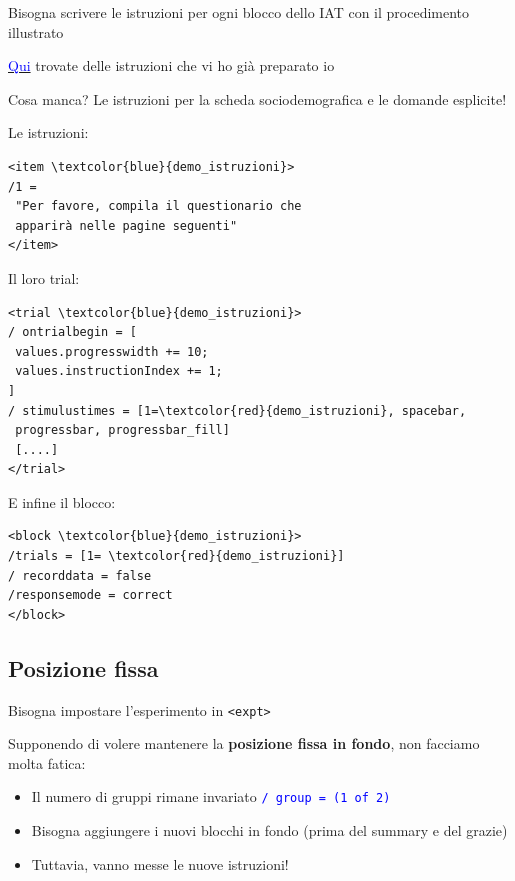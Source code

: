 \documentclass{beamer}
\begin{document}
\begin{frame}
	Bisogna scrivere le istruzioni per ogni blocco dello IAT con il procedimento illustrato
	
	
	\vspace{3mm}
	\href{https://drive.google.com/file/d/11qOVR5-yGDc1lRPUpTt7327o9Z2Tt4_A/view?usp=sharing}{\textcolor{blue}{Qui}} trovate delle istruzioni che vi ho già preparato io 
	
	\vspace{3mm}
	Cosa manca? Le istruzioni per la scheda sociodemografica e le domande esplicite! 
\end{frame}

\begin{frame}[fragile]
	\begin{small}
			Le istruzioni:

\begin{Verbatim}[commandchars=\\\{\}]
<item \textcolor{blue}{demo_istruzioni}>
/1 = 
 "Per favore, compila il questionario che 
 apparirà nelle pagine seguenti"
</item>
\end{Verbatim}
		
		Il loro trial: 
		
		
		\begin{Verbatim}[commandchars=\\\{\}]
<trial \textcolor{blue}{demo_istruzioni}>
/ ontrialbegin = [
 values.progresswidth += 10;
 values.instructionIndex += 1;
]
/ stimulustimes = [1=\textcolor{red}{demo_istruzioni}, spacebar, 
 progressbar, progressbar_fill]
 [....]
</trial>
		\end{Verbatim}
	\end{small}
\end{frame}

\begin{frame}[fragile]
	 E infine il blocco:
		\begin{Verbatim}[commandchars=\\\{\}]
<block \textcolor{blue}{demo_istruzioni}>
/trials = [1= \textcolor{red}{demo_istruzioni}]
/ recorddata = false
/responsemode = correct
</block>
	\end{Verbatim}
\end{frame}

\subsection*{Posizione fissa}

\begin{frame}
	Bisogna impostare l'esperimento in \texttt{<expt>}
	
	Supponendo di volere mantenere la \textbf{posizione fissa in fondo}, non facciamo molta fatica: 
	
	\begin{itemize}
		\item Il numero di gruppi rimane invariato \textcolor{blue}{\texttt{/ group = (1 of 2)}}
		\item Bisogna aggiungere i nuovi blocchi in fondo (prima del summary e del grazie)
		\item  Tuttavia, vanno messe le nuove istruzioni! 
	\end{itemize}
\end{frame}
\end{document}
